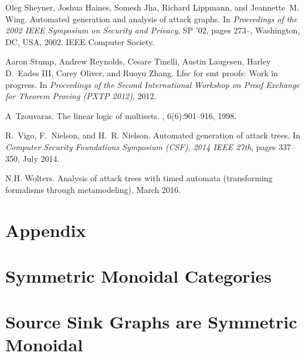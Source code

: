 \documentclass{sigplanconf}
\begin{document}
\begin{thebibliography}{10}
  Oleg Sheyner, Joshua Haines, Somesh Jha, Richard Lippmann, and Jeannette~M.
  Wing.
  \newblock Automated generation and analysis of attack graphs.
  \newblock In {\em Proceedings of the 2002 IEEE Symposium on Security and
    Privacy}, SP '02, pages 273--, Washington, DC, USA, 2002. IEEE Computer
  Society.

  Aaron Stump, Andrew Reynolds, Cesare Tinelli, Austin Laugesen, Harley D.~Eades
  III, Corey Oliver, and Ruoyu Zhang.
  \newblock Lfsc for smt proofs: Work in progress.
  \newblock In {\em Proceedings of the Second International Workshop on Proof
    Exchange for Theorem Proving (PXTP 2012)}, 2012.

  A~Tzouvaras.
  \newblock The linear logic of multisets.
  , 6(6):901--916, 1998.

  R.~Vigo, F.~Nielson, and H.~R. Nielson.
  \newblock Automated generation of attack trees.
  \newblock In {\em Computer Security Foundations Symposium (CSF), 2014 IEEE
    27th}, pages 337--350, July 2014.

  N.H. {Wolters}.
  \newblock Analysis of attack trees with timed automata (transforming formalisms
  through metamodeling), March 2016.

\end{thebibliography}


\appendix

\section*{Appendix}
\label{sec:appendix}
\section{Symmetric Monoidal Categories}
\label{sec:symmetric_monoidal_categories}


\section{Source Sink Graphs are Symmetric Monoidal}
\label{sec:source_sink_graphs_are_symmetric_monoidal}

\end{document}
